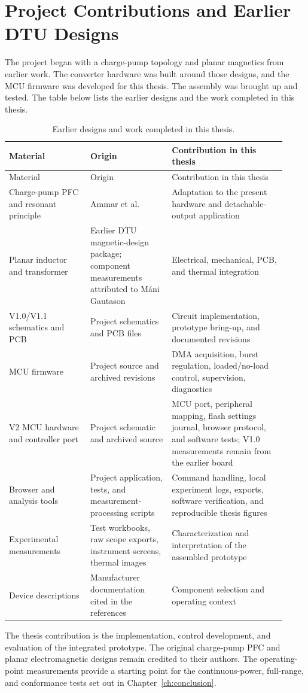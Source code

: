 \chapter{Project Contributions and Earlier DTU Designs}
\label{app:provenance}

The project began with a charge-pump topology and planar magnetics from earlier
work. The converter hardware was built around those designs, and the MCU firmware
was developed for this thesis. The assembly was brought up and tested. The table
below lists the earlier designs and the work completed in this thesis.

\begin{longtable}{@{}L{0.27\linewidth}L{0.27\linewidth}L{0.38\linewidth}@{}}
\caption{Earlier designs and work completed in this thesis.}\\
\toprule Material & Origin & Contribution in this thesis\\\midrule
\endfirsthead
\toprule Material & Origin & Contribution in this thesis\\\midrule
\endhead
Charge-pump PFC and resonant principle & Ammar et al. \cite{ammar2020chargepump,ammar2021led} & Adaptation to the present hardware and detachable-output application\\
Planar inductor and transformer & Earlier DTU magnetic-design package; component measurements attributed to M\'ani Gautason & Electrical, mechanical, PCB, and thermal integration\\
V1.0/V1.1 schematics and PCB & Project schematics and PCB files & Circuit implementation, prototype bring-up, and documented revisions\\
MCU firmware & Project source and archived revisions & DMA acquisition, burst regulation, loaded/no-load control, supervision, diagnostics\\
V2 MCU hardware and controller port & Project schematic and archived source & MCU port, peripheral mapping, flash settings journal, browser protocol, and software tests; V1.0 measurements remain from the earlier board\\
Browser and analysis tools & Project application, tests, and measurement-processing scripts & Command handling, local experiment logs, exports, software verification, and reproducible thesis figures\\
Experimental measurements & Test workbooks, raw scope exports, instrument screens, thermal images & Characterization and interpretation of the assembled prototype\\
Device descriptions & Manufacturer documentation cited in the references & Component selection and operating context\\
\bottomrule
\end{longtable}

The thesis contribution is the implementation, control development, and
evaluation of the integrated prototype. The original charge-pump PFC and
planar electromagnetic designs remain credited to their authors. The
operating-point measurements provide a starting point for the continuous-power,
full-range, and conformance tests set out in Chapter~\ref{ch:conclusion}.
